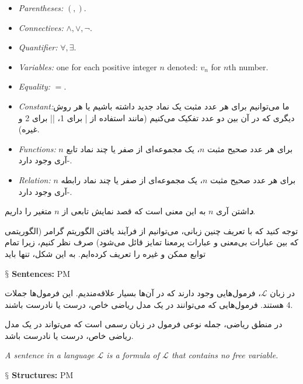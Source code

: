 \documentclass[10pt,a4paper]{article}
\newenvironment{callout}
	{\begin{calloutbox}\color{charcoal}\textbf\textit}
	{\end{calloutbox}}
\newcommand{\newpoint}[1]{\indent$\mathsection$ \textbf{#1}}
\newcommand{\curveL}{\mathcal{L}}
\begin{document}
                    \begin{itemize}
                        \item \textit{Parentheses:} $(,)$.
                        \item \textit{Connectives:} $\land, \lor, \neg$.
                        \item \textit{Quantifier:} $\forall, \exists$.
                        \item \textit{Variables:} one for each positive integer $n$ denoted: $v_n$ for $n$th number.
                        \item \textit{Equality:} $=$.
                        \item \textit{Constant:}ما می‌توانیم برای هر عدد مثبت یک نماد جدید داشته باشیم یا هر روش دیگری که در آن بین دو عدد تفکیک می‌کنیم (مانند استفاده از | برای 1، || برای 2 و غیره).
                        \item \textit{Functions:} برای هر عدد صحیح مثبت $n$، یک مجموعه‌ای از صفر یا چند نماد تابع $n$-آری وجود دارد.
                        \item \textit{Relation:} برای هر عدد صحیح مثبت $n$، یک مجموعه‌ای از صفر یا چند نماد رابطه $n$-آری وجود دارد.
                    \end{itemize}
                    \begin{callout}
                        داشتن آری $n$ به این معنی است که قصد نمایش تابعی از $n$ متغیر را داریم.
                    \end{callout}
                    توجه کنید که با تعریف چنین زبانی، می‌توانیم از فرآیند یافتن الگوریتم گرامر (الگوریتمی که بین عبارات بی‌معنی و عبارات پرمعنا تمایز قائل می‌شود) صرف نظر کنیم، زیرا تمام توابع ممکن و غیره را تعریف کرده‌ایم. به این شکل، تنها باید 

                    \newpoint{Sentences:} PM

در زبان $\curveL$، فرمول‌هایی وجود دارند که در آن‌ها بسیار علاقه‌مندیم. این فرمول‌ها جملات 4 هستند. فرمول‌هایی که می‌توانند در یک مدل ریاضی خاص، درست یا نادرست باشند.

در منطق ریاضی، جمله نوعی فرمول در زبان رسمی است که می‌تواند در یک مدل ریاضی خاص، درست یا نادرست باشد. \cite{Leary2019-ip}
                    \begin{define}
                        \textit{A sentence in a language $\curveL$ is a formula of $\curveL$ that contains no free variable.}
                    \end{define}
                    \newpoint{Structures: } PM
\end{document}

